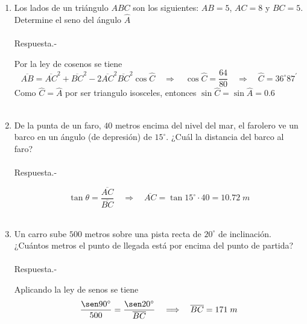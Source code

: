 \documentclass[10pt]{article}
\begin{document}
\begin{enumerate}
\item Los lados de un triángulo $ABC$ son los siguientes: $AB = 5$, $AC = 8$ y $BC = 5$. Determine el seno del ángulo $\widehat{A}$\\\\ 
	Respuesta.-\; 
	\begin{center}
	\end{center}
	Por la ley de cosenos se tiene $$\overline{AB}=\overline{AC}^2 + \overline{BC}^2 - 2\overline{AC}^2 \overline{BC}^2 \cos \widehat{C} \quad \Longrightarrow \quad \cos \widehat{C} = \dfrac{64}{80} \quad \Longrightarrow \quad \widehat{C} = 36^\circ 87^{'}$$
	Como $\widehat{C}=\widehat{A}$ por ser triangulo isosceles, entonces $\sin \widehat{C}=\sin \widehat{A} = 0.6$\\\\

\item De la punta de un faro, $40$ metros encima del nivel del mar, el farolero ve un barco en un ángulo (de depresión) de $15^\circ$. ¿Cuál la distancia del barco al faro?\\\\
    Respuesta.-\; 
	\begin{center}
	\end{center}
	$$\tan \theta = \dfrac{\overline{AC}}{\overline{BC}} \quad \Longrightarrow \quad \overline{AC} = \tan 15^\circ \cdot 40 = 10.72 \; m$$\\

\item Un carro sube $500$ metros sobre una pista recta de $20^\circ$ de inclinación. ¿Cuántos metros el punto de llegada está por encima del punto de partida?\\\\
    Respuesta.-\; 
	\begin{center}
	\end{center}
	Aplicando la ley de senos se tiene $$\dfrac{\sen 90^\circ}{500}=\dfrac{\sen 20^\circ}{\overline{BC}} \quad \Longrightarrow \quad \overline{BC} = 171\; m$$



\end{enumerate}
\end{document}
